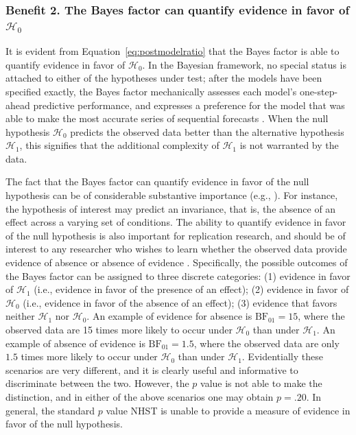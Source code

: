\subsubsection{Benefit 2. The Bayes factor can quantify evidence in favor of $\mathcal{H}_0$}
It is evident from Equation~\ref{eq:postmodelratio} that the Bayes factor is able to quantify evidence in favor of $\mathcal{H}_0$. In the Bayesian framework, no special status is attached to either of the hypotheses under test; after the models have been specified exactly, the Bayes factor mechanically assesses each model's one-step-ahead predictive performance, and expresses a preference for the model that was able to make the most accurate series of sequential forecasts \cite{WagenmakersEtAl2006}. When the null hypothesis $\mathcal{H}_0$ predicts the observed data better than the alternative hypothesis $\mathcal{H}_1$, this signifies that the additional complexity of $\mathcal{H}_1$ is not warranted by the data.

The fact that the Bayes factor can quantify evidence in favor of the null hypothesis can be of considerable substantive importance (e.g., ). For instance, the hypothesis of interest may predict an invariance, that is, the absence of an effect across a varying set of conditions. The ability to quantify evidence in favor of the null hypothesis is also important for replication research, and should be of interest to any researcher who wishes to learn whether the observed data provide evidence of absence or absence of evidence \cite{Dienes2014}. Specifically, the possible outcomes of the Bayes factor can be assigned to three discrete categories: (1) evidence in favor of $\mathcal{H}_1$ (i.e., evidence in favor of the presence of an effect); (2) evidence in favor of $\mathcal{H}_0$ (i.e., evidence in favor of the absence of an effect); (3) evidence that favors neither $\mathcal{H}_1$ nor $\mathcal{H}_0$. An example of evidence for absence is $\text{BF}_{01} = 15$, where the observed data are 15 times more likely to occur under $\mathcal{H}_0$ than under $\mathcal{H}_1$. An example of absence of evidence is $\text{BF}_{01} = 1.5$, where the observed data are only $1.5$ times more likely to occur under $\mathcal{H}_0$ than under $\mathcal{H}_1$. Evidentially these scenarios are very different, and it is clearly useful and informative to discriminate between the two. However, the $p$ value is not able to make the distinction, and in either of the above scenarios one may obtain $p=.20$. In general, the standard $p$ value NHST is unable to provide a measure of evidence in favor of the null hypothesis.

